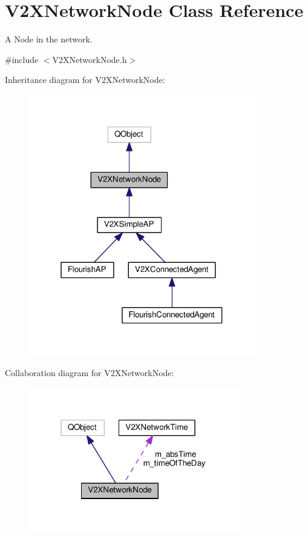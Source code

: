 \hypertarget{classV2XNetworkNode}{}\section{V2\+X\+Network\+Node Class Reference}
\label{classV2XNetworkNode}


A Node in the network.  




{\ttfamily \#include $<$V2\+X\+Network\+Node.\+h$>$}



Inheritance diagram for V2\+X\+Network\+Node\+:\nopagebreak
\begin{figure}[H]
\begin{center}
\leavevmode
\includegraphics[width=280pt]{classV2XNetworkNode__inherit__graph}
\end{center}
\end{figure}


Collaboration diagram for V2\+X\+Network\+Node\+:\nopagebreak
\begin{figure}[H]
\begin{center}
\leavevmode
\includegraphics[width=260pt]{classV2XNetworkNode__coll__graph}
\end{center}
\end{figure}
